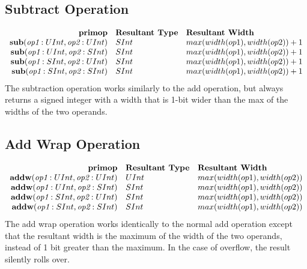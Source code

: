 \documentclass[12pt]{article}
\begin{document}
\subsection{Subtract Operation}
\[
\begin{array}{rll}
\text{\bf primop} & \text{\bf Resultant Type} & \text{\bf Resultant Width} \\
\text{\bf sub}(\text{\em op1}:UInt, \text{\em op2}:UInt) &  SInt & max(width(op1),width(op2)) + 1  \\
\text{\bf sub}(\text{\em op1}:UInt, \text{\em op2}:SInt) &  SInt & max(width(op1),width(op2)) + 1  \\
\text{\bf sub}(\text{\em op1}:SInt, \text{\em op2}:UInt) &  SInt & max(width(op1),width(op2)) + 1  \\
\text{\bf sub}(\text{\em op1}:SInt, \text{\em op2}:SInt) &  SInt & max(width(op1),width(op2)) + 1  \\
\end{array}
\]
The subtraction operation works similarly to the add operation, but always returns a signed integer with a width that is 1-bit wider than the max of the widths of the two operands.

\subsection{Add Wrap Operation}
\[
\begin{array}{rll}
\text{\bf primop} & \text{\bf Resultant Type} & \text{\bf Resultant Width} \\
\text{\bf addw}(\text{\em op1}:UInt, \text{\em op2}:UInt) & UInt & max(width(op1),width(op2)) \\
\text{\bf addw}(\text{\em op1}:UInt, \text{\em op2}:SInt) & SInt & max(width(op1),width(op2)) \\
\text{\bf addw}(\text{\em op1}:SInt, \text{\em op2}:UInt) & SInt & max(width(op1),width(op2)) \\
\text{\bf addw}(\text{\em op1}:SInt, \text{\em op2}:SInt) & SInt & max(width(op1),width(op2)) \\
\end{array}
\]
The add wrap operation works identically to the normal add operation except that the resultant width is the maximum of the width of the two operands, instead of 1 bit greater than the maximum.
In the case of overflow, the result silently rolls over.
\end{document}
